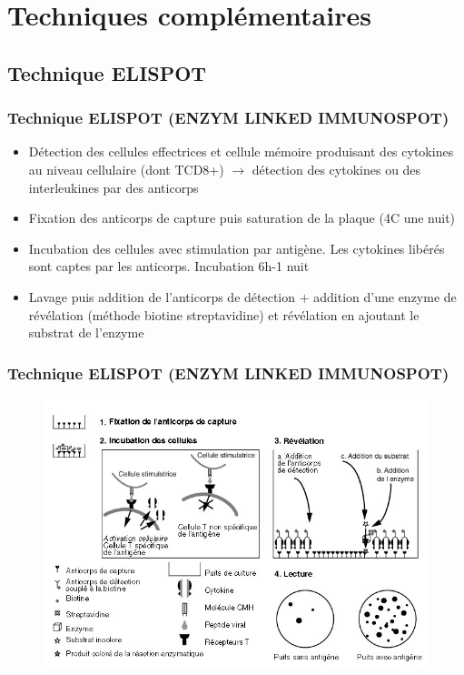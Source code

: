 \documentclass[12pt]{beamer}
\begin{document}
\section{Techniques complémentaires}
\subsection{Technique ELISPOT}

\begin{frame}
  \transuncover
  \frametitle{Technique ELISPOT (ENZYM LINKED IMMUNOSPOT)}
  
  \begin{itemize}
  	\item Détection des cellules effectrices et cellule mémoire produisant des cytokines au niveau cellulaire (dont TCD8+) $\rightarrow $ détection des cytokines ou des interleukines par des anticorps
  	\item Fixation des anticorps de capture puis saturation de la plaque (4\degres C une nuit)
  	\item Incubation des cellules avec stimulation par antigène. Les cytokines libérés sont captes par les anticorps. Incubation 6h-1 nuit
  	\item Lavage puis addition de l'anticorps de détection $+$ addition d'une enzyme de révélation (méthode biotine streptavidine) et révélation en ajoutant le substrat de l'enzyme
  \end{itemize}

\end{frame}

 \begin{frame}
 	\frametitle{Technique ELISPOT (ENZYM LINKED IMMUNOSPOT)}
 	\begin{figure}
 		\includegraphics[width=0.7\linewidth]{elispot.jpg}
 	\end{figure}
 	
 \end{frame}
\end{document}
